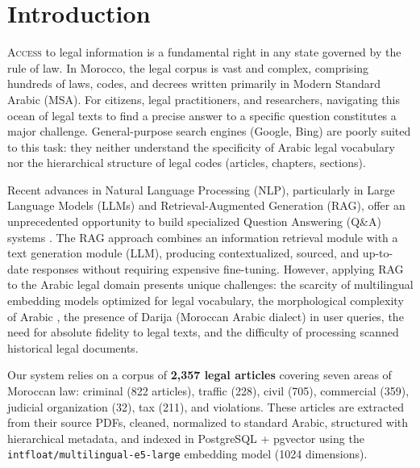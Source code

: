 \section{Introduction}

\lettrine[lines=2]{\color{titleblue}A}{ccess} to legal information is a
fundamental right in any state governed by the rule of law. In Morocco,
the legal corpus is vast and complex, comprising hundreds of laws, codes,
and decrees written primarily in Modern Standard Arabic (MSA). For citizens,
legal practitioners, and researchers, navigating this ocean of legal texts
to find a precise answer to a specific question constitutes a major challenge.
General-purpose search engines (Google, Bing) are poorly suited to this task:
they neither understand the specificity of Arabic legal vocabulary nor the
hierarchical structure of legal codes (articles, chapters, sections).

\vspace{0.2cm}

\noindent Recent advances in Natural Language Processing (NLP), particularly
in Large Language Models (LLMs) and Retrieval-Augmented Generation (RAG),
offer an unprecedented opportunity to build specialized Question Answering
(Q\&A) systems \cite{lewis2020retrieval}. The RAG approach combines an
information retrieval module with a text generation module (LLM), producing
contextualized, sourced, and up-to-date responses without requiring expensive
fine-tuning. However, applying RAG to the Arabic legal domain presents unique
challenges: the scarcity of multilingual embedding models optimized for legal
vocabulary, the morphological complexity of Arabic \cite{habash2010arabic},
the presence of Darija (Moroccan Arabic dialect) in user queries, the need
for absolute fidelity to legal texts, and the difficulty of processing
scanned historical legal documents.

\vspace{0.2cm}

\noindent Our system relies on a corpus of \textbf{2,357 legal articles}
covering seven areas of Moroccan law: criminal (822 articles), traffic (228),
civil (705), commercial (359), judicial organization (32), tax (211), and
violations. These articles are extracted from their source PDFs, cleaned,
normalized to standard Arabic, structured with hierarchical metadata, and
indexed in PostgreSQL + pgvector using the
\texttt{intfloat/multilingual-e5-large} embedding model (1024 dimensions).

\vspace{0.2cm}

